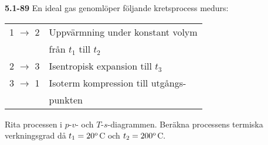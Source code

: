 \documentclass[./exercises.tex]{subfiles}
\begin{document}
\noindent\textbf{5.1-89}\hfill\break
\noindent En ideal gas genomlöper följande kretsprocess medurs:\hfil\par
\noindent\begin{tabular}{ l l  } 
1 $\rightarrow$ 2 & Uppvärmning under konstant volym\\
                  & från $t_1$ till $t_2$  \\ 
2 $\rightarrow$ 3 & Isentropisk expansion till $t_3$  \\ 
3 $\rightarrow$ 1 & Isoterm kompression till utgångs-\\
                  &punkten \\ 
\end{tabular}


Rita processen i $p$-$v$- och $T$-$s$-diagrammen. Beräkna processens termiska
verkningsgrad då $t_1=20^{\rm{o}}$C och $t_2=200^{\rm{o}}$C.

\bigskip
\end{document}
